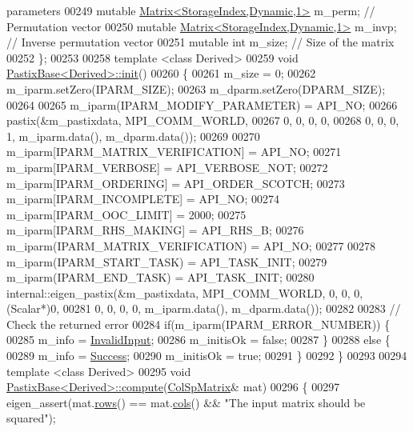 \begin{DoxyCode}
{       parameters}
00249     \textcolor{keyword}{mutable} \hyperlink{group___core___module}{Matrix<StorageIndex,Dynamic,1>} m\_perm;  \textcolor{comment}{// Permutation vector}
00250     \textcolor{keyword}{mutable} \hyperlink{group___core___module}{Matrix<StorageIndex,Dynamic,1>} m\_invp;  \textcolor{comment}{// Inverse permutation
       vector}
00251     \textcolor{keyword}{mutable} \textcolor{keywordtype}{int} m\_size; \textcolor{comment}{// Size of the matrix }
00252 \}; 
00253 
00258 \textcolor{keyword}{template} <\textcolor{keyword}{class} Derived>
00259 \textcolor{keywordtype}{void} \hyperlink{class_eigen_1_1_pastix_base_ac6202714edd1943646e34f16ad384336}{PastixBase<Derived>::init}()
00260 \{
00261   m\_size = 0; 
00262   m\_iparm.setZero(IPARM\_SIZE);
00263   m\_dparm.setZero(DPARM\_SIZE);
00264   
00265   m\_iparm(IPARM\_MODIFY\_PARAMETER) = API\_NO;
00266   pastix(&m\_pastixdata, MPI\_COMM\_WORLD,
00267          0, 0, 0, 0,
00268          0, 0, 0, 1, m\_iparm.data(), m\_dparm.data());
00269   
00270   m\_iparm[IPARM\_MATRIX\_VERIFICATION] = API\_NO;
00271   m\_iparm[IPARM\_VERBOSE]             = API\_VERBOSE\_NOT;
00272   m\_iparm[IPARM\_ORDERING]            = API\_ORDER\_SCOTCH;
00273   m\_iparm[IPARM\_INCOMPLETE]          = API\_NO;
00274   m\_iparm[IPARM\_OOC\_LIMIT]           = 2000;
00275   m\_iparm[IPARM\_RHS\_MAKING]          = API\_RHS\_B;
00276   m\_iparm(IPARM\_MATRIX\_VERIFICATION) = API\_NO;
00277   
00278   m\_iparm(IPARM\_START\_TASK) = API\_TASK\_INIT;
00279   m\_iparm(IPARM\_END\_TASK) = API\_TASK\_INIT;
00280   internal::eigen\_pastix(&m\_pastixdata, MPI\_COMM\_WORLD, 0, 0, 0, (Scalar*)0,
00281                          0, 0, 0, 0, m\_iparm.data(), m\_dparm.data());
00282   
00283   \textcolor{comment}{// Check the returned error}
00284   \textcolor{keywordflow}{if}(m\_iparm(IPARM\_ERROR\_NUMBER)) \{
00285     m\_info = \hyperlink{group__enums_gga85fad7b87587764e5cf6b513a9e0ee5ea945604f62795ffc70aedf2bd12ea0434}{InvalidInput};
00286     m\_initisOk = \textcolor{keyword}{false};
00287   \}
00288   \textcolor{keywordflow}{else} \{ 
00289     m\_info = \hyperlink{group__enums_gga85fad7b87587764e5cf6b513a9e0ee5ea52581b035f4b59c203b8ff999ef5fcea}{Success};
00290     m\_initisOk = \textcolor{keyword}{true};
00291   \}
00292 \}
00293 
00294 \textcolor{keyword}{template} <\textcolor{keyword}{class} Derived>
00295 \textcolor{keywordtype}{void} \hyperlink{class_eigen_1_1_pastix_base}{PastixBase<Derived>::compute}(\hyperlink{group___sparse_core___module}{ColSpMatrix}& mat)
00296 \{
00297   eigen\_assert(mat.\hyperlink{group___sparse_core___module_a62e61bb861eee306d5b069ce652b5aa5}{rows}() == mat.\hyperlink{group___sparse_core___module_aa391750e3c530227e4a5c3c52e959975}{cols}() && \textcolor{stringliteral}{"The input matrix should be squared"});

\end{DoxyCode}

